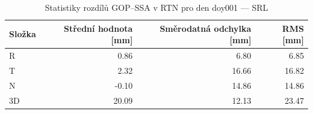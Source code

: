\begin{table}[H]
\centering
\caption{Statistiky rozdílů GOP–SSA v RTN pro den doy001 — SRL}
\label{tab:sa_ZAZG_doy001_day_stats}
\begin{tabular}{lrrr}
\toprule
Složka & Střední hodnota [mm] & Směrodatná odchylka [mm] & RMS [mm] \\
\midrule
R & 0.86 & 6.80 & 6.85 \\
T & 2.32 & 16.66 & 16.82 \\
N & -0.10 & 14.86 & 14.86 \\
3D & 20.09 & 12.13 & 23.47 \\
\bottomrule
\end{tabular}
\end{table}
